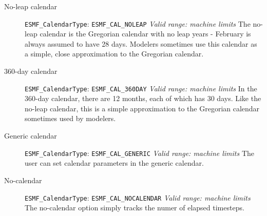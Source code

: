 \begin{description}
\item[No-leap calendar]
{\tt ESMF\_CalendarType}:  {\tt ESMF\_CAL\_NOLEAP} \newline
{\it Valid range: machine limits} \newline
The no-leap calendar is the Gregorian calendar with no leap years - 
February is always assumed to have 28 days.  Modelers sometimes use this 
calendar as a simple, close approximation to the Gregorian calendar.

\item[360-day calendar]
{\tt ESMF\_CalendarType}:  {\tt ESMF\_CAL\_360DAY} \newline
{\it Valid range: machine limits} \newline
In the 360-day calendar, there are 12 months, each of which has 30 days.  
Like the no-leap calendar, this is a simple approximation to the Gregorian
calendar sometimes used by modelers.

\item[Generic calendar] 
{\tt ESMF\_CalendarType}:  {\tt ESMF\_CAL\_GENERIC} \newline
{\it Valid range: machine limits} \newline 
The user can set calendar parameters in the generic calendar.

\item[No-calendar]
{\tt ESMF\_CalendarType}:  {\tt ESMF\_CAL\_NOCALENDAR} \newline
{\it Valid range: machine limits} \newline 
The no-calendar option simply tracks the numer of elapsed timesteps.

\end{description}




